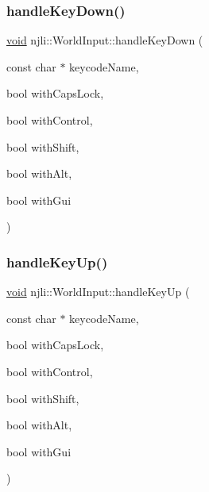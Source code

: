 \subsubsection{\texorpdfstring{handle\+Key\+Down()}{handleKeyDown()}}
{\footnotesize\ttfamily \mbox{\hyperlink{_thread_8h_af1e856da2e658414cb2456cb6f7ebc66}{void}} njli\+::\+World\+Input\+::handle\+Key\+Down (\begin{DoxyParamCaption}\item[{const char $\ast$}]{keycode\+Name,  }\item[{bool}]{with\+Caps\+Lock,  }\item[{bool}]{with\+Control,  }\item[{bool}]{with\+Shift,  }\item[{bool}]{with\+Alt,  }\item[{bool}]{with\+Gui }\end{DoxyParamCaption})}

\mbox{\label{classnjli_1_1_world_input_aa63d0257cecc72faedd01402d9f1df9c}} 
\subsubsection{\texorpdfstring{handle\+Key\+Up()}{handleKeyUp()}}
{\footnotesize\ttfamily \mbox{\hyperlink{_thread_8h_af1e856da2e658414cb2456cb6f7ebc66}{void}} njli\+::\+World\+Input\+::handle\+Key\+Up (\begin{DoxyParamCaption}\item[{const char $\ast$}]{keycode\+Name,  }\item[{bool}]{with\+Caps\+Lock,  }\item[{bool}]{with\+Control,  }\item[{bool}]{with\+Shift,  }\item[{bool}]{with\+Alt,  }\item[{bool}]{with\+Gui }\end{DoxyParamCaption})}

\mbox{\label{classnjli_1_1_world_input_a6c7011e9f8635a33b34afe24a8bc5b08}} 
